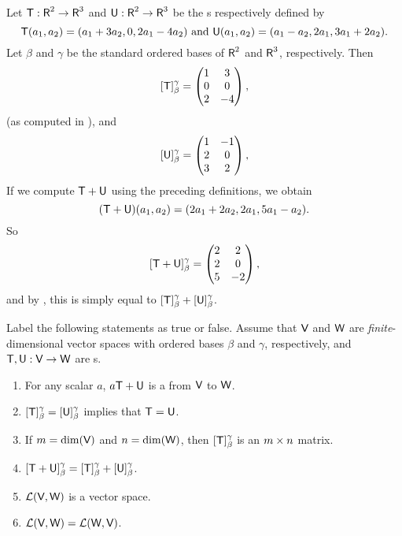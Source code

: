 \begin{example} \label{example 2.2.5}
Let \(\textsf{T} : \textsf{R}^2 \to \textsf{R}^3\) and \(\textsf{U} : \textsf{R}^2 \to \textsf{R}^3\) be the \LTRAN{}s respectively defined by
\[
    \textsf{T}(a_1, a_2) = (a_1 + 3a_2, 0, 2a_1 - 4a_2) \text{ and } \textsf{U}(a_1, a_2) = (a_1 - a_2, 2a_1, 3a_1 + 2a_2).
\]
Let \(\beta\) and \(\gamma\) be the standard ordered bases of \(\textsf{R}^2\) and \(\textsf{R}^3\), respectively.
Then
\[
    [\textsf{T}]_{\beta}^{\gamma} = \begin{pmatrix} 1 & 3 \\ 0 & 0 \\ 2 & -4 \end{pmatrix},
\]
(as computed in ), and
\[
    [\textsf{U}]_{\beta}^{\gamma} = \begin{pmatrix} 1 & -1 \\ 2 & 0 \\ 3 & 2 \end{pmatrix},
\]
If we compute \(\textsf{T} + \textsf{U}\) using the preceding definitions, we obtain
\[
    (\textsf{T} + \textsf{U})(a_1, a_2) = (2a_1 + 2a_2, 2a_1, 5a_1 - a_2).
\]
So
\[
    [\textsf{T} + \textsf{U}]_{\beta}^{\gamma} = \begin{pmatrix} 2 & 2 \\ 2 & 0 \\ 5 & -2 \end{pmatrix},
\]
and by , this is simply equal to \([\textsf{T}]_{\beta}^{\gamma} + [\textsf{U}]_{\beta}^{\gamma}\).
\end{example}

\exercisesection

\begin{exercise} \label{exercise 2.2.1}
Label the following statements as true or false.
Assume that \(\textsf{V}\) and \(\textsf{W}\) are \emph{finite}-dimensional vector spaces with ordered bases \(\beta\) and \(\gamma\), respectively, and \(\textsf{T}, \textsf{U} : \textsf{V} \to \textsf{W}\) are \LTRAN{}s.
\begin{enumerate}
\item For any scalar \(a\), \(a\textsf{T} + \textsf{U}\) is a \LTRAN{} from \(\textsf{V}\) to \(\textsf{W}\).
\item \([\textsf{T}]_{\beta}^{\gamma} = [\textsf{U}]_{\beta}^{\gamma}\) implies that \(\textsf{T} = \textsf{U}\).
\item If \(m = \dim(\textsf{V})\) and \(n = \dim(\textsf{W})\), then \([\textsf{T}]_{\beta}^{\gamma}\) is an \(m \times n\) matrix.
\item \([\textsf{T} + \textsf{U}]_{\beta}^{\gamma} = [\textsf{T}]_{\beta}^{\gamma} + [\textsf{U}]_{\beta}^{\gamma}\).
\item \(\mathcal{L}(\textsf{V}, \textsf{W})\) is a vector space.
\item \(\mathcal{L}(\textsf{V}, \textsf{W}) = \mathcal{L}(\textsf{W}, \textsf{V})\).
\end{enumerate}
\end{exercise}

